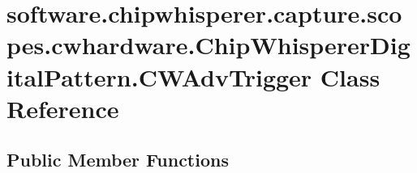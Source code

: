 \hypertarget{classsoftware_1_1chipwhisperer_1_1capture_1_1scopes_1_1cwhardware_1_1ChipWhispererDigitalPattern_1_1CWAdvTrigger}{}\section{software.\+chipwhisperer.\+capture.\+scopes.\+cwhardware.\+Chip\+Whisperer\+Digital\+Pattern.\+C\+W\+Adv\+Trigger Class Reference}
\label{classsoftware_1_1chipwhisperer_1_1capture_1_1scopes_1_1cwhardware_1_1ChipWhispererDigitalPattern_1_1CWAdvTrigger}
\subsection*{Public Member Functions}
